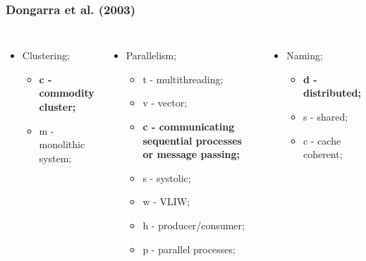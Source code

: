 \documentclass{beamer}
\begin{document}
\begin{frame}
  \frametitle{Dongarra et al. (2003)}

  \begin{columns}
    \begin{itemize}
      \item Clustering;
            \begin{itemize}
              \item \textbf{c - commodity cluster;}
              \item m - monolithic system;
            \end{itemize}
    \end{itemize}

    \begin{itemize}
      \item Parallelism;
            \begin{itemize}
              \item t - multithreading;
              \item v - vector;
              \item \textbf{c - communicating sequential processes or message passing;}
              \item s - systolic;
              \item w - VLIW;
              \item h - producer/consumer;
              \item p - parallel processes;
            \end{itemize}
    \end{itemize}

    \begin{itemize}
      \item Naming;
            \begin{itemize}
              \item \textbf{d - distributed;}
              \item s - shared;
              \item c - cache coherent;
            \end{itemize}
    \end{itemize}


\end{columns}
\end{frame}
\end{document}
